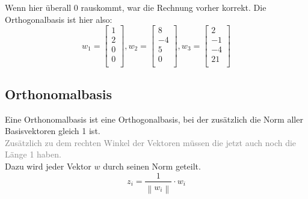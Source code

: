 \documentclass{report}
\begin{document}
			Wenn hier überall 0 rauskommt, war die Rechnung vorher korrekt. Die Orthogonalbasis ist hier also:
			\begin{equation*}
				w_1 = \begin{bmatrix} 1 \\ 2 \\ 0 \\ 0 \\ \end{bmatrix}, 
				w_2 = \begin{bmatrix} 8 \\ -4 \\ 5 \\ 0 \\ \end{bmatrix}, 
				w_3 = \begin{bmatrix} 2 \\ -1 \\ -4 \\ 21 \\ \end{bmatrix}
			\end{equation*}
		\subsection*{Orthonomalbasis}
			Eine Orthonomalbasis ist eine Orthogonalbasis, bei der zusätzlich die Norm aller Basisvektoren gleich 1 ist.\\
			\textcolor{gray}{Zusätzlich zu dem rechten Winkel der Vektoren müssen die jetzt auch noch die Länge 1 haben.}\\
			Dazu wird jeder Vektor $w$ durch seinen Norm geteilt.
			\begin{equation*}
				z_i = \frac{1}{\left\lVert w_i \right\rVert} \cdot w_i
			\end{equation*}
\end{document}
